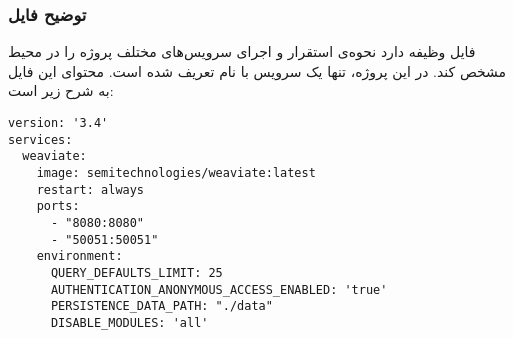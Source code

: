 \documentclass{article}
\begin{document}
\subsubsection{توضیح فایل }
فایل  وظیفه دارد نحوه‌ی استقرار و اجرای سرویس‌های مختلف پروژه را در محیط  مشخص کند.  
در این پروژه، تنها یک سرویس با نام  تعریف شده است.  
محتوای این فایل به شرح زیر است:
\begin{latin}
\begin{lstlisting}
version: '3.4'
services:
  weaviate:
    image: semitechnologies/weaviate:latest
    restart: always
    ports:
      - "8080:8080"
      - "50051:50051"
    environment:
      QUERY_DEFAULTS_LIMIT: 25
      AUTHENTICATION_ANONYMOUS_ACCESS_ENABLED: 'true'
      PERSISTENCE_DATA_PATH: "./data"
      DISABLE_MODULES: 'all'
\end{lstlisting}
\end{latin}
\end{document}
